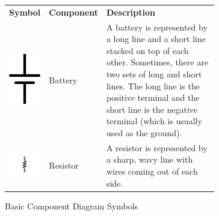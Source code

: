 \begin{figure}
\caption{Basic Component Diagram Symbols}
\label{figBasicDiagramSymbols}
\begin{center}
\begin{tabular}{M{0.1\linewidth} | M{0.12\linewidth} | m{0.6\linewidth}}
\textbf{Symbol} & \textbf{Component} & \textbf{Description} \\
\includegraphics[scale=0.125]{BatterySymbol.png} & Battery & A battery is represented by a long line and a short line stacked on top of each other.  Sometimes, there are two sets of long and short lines.  The long line is the positive terminal and the short line is the negative terminal (which is usually used as the ground). \\ \hline
\includegraphics[scale=0.25]{ResistorSymbol.pdf} & Resistor & A resistor is represented by a sharp, wavy line with wires coming out of each side. \\ \hline

\end{tabular}
\end{center}
\end{figure}
